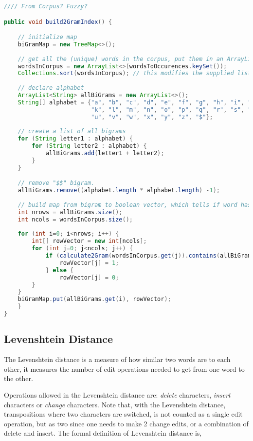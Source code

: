 \begin{lstlisting}[language=Java, caption=This is a code example., label=lst:2-gram]
//// From Corpus? Fuzzy?

public void build2GramIndex() {

	// initialize map
	biGramMap = new TreeMap<>();
	
	// get all the (unique) words in the corpus, put them in an ArrayList and sort them alphabetically.
	wordsInCorpus = new ArrayList<>(wordsToOccurences.keySet()); 
	Collections.sort(wordsInCorpus); // this modifies the supplied list
	
	// declare alphabet
	ArrayList<String> allBiGrams = new ArrayList<>();
	String[] alphabet = {"a", "b", "c", "d", "e", "f", "g", "h", "i", "j",
						 "k", "l", "m", "n", "o", "p", "q", "r", "s", "t",
						 "u", "v", "w", "x", "y", "z", "$"};
	
	// create a list of all bigrams
	for (String letter1 : alphabet) {
		for (String letter2 : alphabet) {
			allBiGrams.add(letter1 + letter2);
		}
	}

	// remove "$$" bigram.
	allBiGrams.remove((alphabet.length * alphabet.length) -1);
	
	// build map from bigram to boolean vector, which tells if word has bigram or not.
	int nrows = allBiGrams.size();
	int ncols = wordsInCorpus.size();
	
	for (int i=0; i<nrows; i++) {
		int[] rowVector = new int[ncols];
		for (int j=0; j<ncols; j++) {
			if (calculate2Gram(wordsInCorpus.get(j)).contains(allBiGrams.get(i))) { // inefficient calculates grams to many times. But luckily the map is build only once
				rowVector[j] = 1;
			} else {
				rowVector[j] = 0;
		}
	}
	biGramMap.put(allBiGrams.get(i), rowVector);
	}	
}
\end{lstlisting}


\subsection{Levenshtein Distance}
The Levenshtein distance is a measure of how similar two words are to each other, it measures the number of edit operations needed to get from one word to the other. 

Operations allowed in the Levenshtein distance are: \emph{delete} characters, \emph{insert} characters or \emph{change} characters. Note that, with the Levenshtein distance, transpositions where two characters are switched, is not counted as a single edit operation, but as two since one needs to make 2 change edits, or a combination of delete and insert. The formal definition of Levenshtein distance is,

